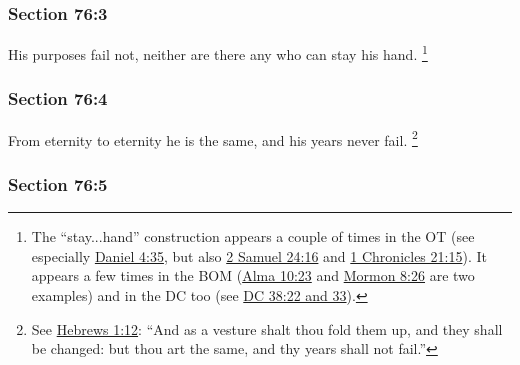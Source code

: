 	\subsubsection{Section 76:3} %
		\label{DC76-3}

		His purposes fail not, neither are there any who can stay his hand.%
			\footnote{%
				\label{DC76-3-stay}%
				The ``stay...hand'' construction appears a couple of times in the OT (see especially \hyperref[DANIEL-4-35]{Daniel 4:35}, but also \hyperref[2SAMUEL-24-16]{2 Samuel 24:16} and \hyperref[1CHRONICLES-21-15]{1 Chronicles 21:15}). It appears a few times in the BOM (\hyperref[ALMA-10-23]{Alma 10:23} and \hyperref[MORMON-8-26]{Mormon 8:26} are two examples) and in the DC too (see \hyperref[DC38-22]{DC 38:22 and 33}).
				}


	\subsubsection{Section 76:4} %
		\label{DC76-4}

		From eternity to eternity he is the same, and his years never fail.%
			\footnote{%
				\label{DC76-4-fail}%
				See \hyperref[HEBREWS-1-12]{Hebrews 1:12}: ``And as a vesture shalt thou fold them up, and they shall be changed: but thou art the same, and thy years shall not fail.''
				}


	\subsubsection{Section 76:5} %
		\label{DC76-5}

